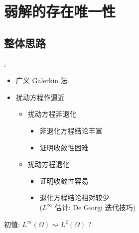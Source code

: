 \documentclass[UTF8]{ctexbeamer}
\begin{document}
\section{弱解的存在唯一性}
\subsection{整体思路}
\begin{frame}{\secname : \subsecname}
    \begin{itemize}
        \item 广义 Galerkin 法
        \item 扰动方程作逼近
        \begin{itemize}
            \item 扰动方程非退化
            \begin{itemize}
                \item 非退化方程结论丰富
                \item 证明收敛性困难
            \end{itemize}
            \item 扰动方程退化
            \begin{itemize}
                \item 证明收敛性容易
                \item 退化方程结论相对较少\\
                ($L^\infty$ 估计: De Giorgi 迭代技巧)
            \end{itemize}
        \end{itemize}
    \end{itemize}

    初值: $L^\infty(\Omega) \rightsquigarrow L^2(\Omega)$ ?
\end{frame}
\end{document}
